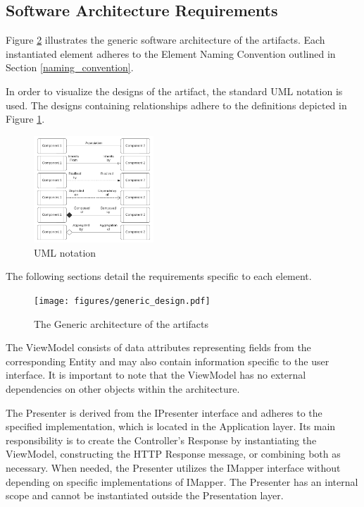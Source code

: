 \subsection{Software Architecture Requirements}\label{software_requirements}

Figure \ref{fig_design} illustrates the generic software architecture of the artifacts.
Each instantiated element adheres to the Element Naming Convention outlined in Section
\ref{naming_convention}. 

In order to visualize the designs of the artifact, the standard UML notation is used. The
designs containing relationships adhere to the definitions depicted in Figure \ref{fi:class_diagram_relationship_notation}.

\begin{figure}[ht!]
  \centering
  \includegraphics[width=0.4\textwidth]{figures/legenda.pdf}
  \caption[UML Notation used]{UML notation}
  \label{fi:class_diagram_relationship_notation}
\end{figure}

The following sections detail the requirements specific to each element.

\begin{figure}[ht!]
    \centering
    \centerline{\texttt{[image: figures/generic\_design.pdf]}}
    \caption[Generic architecture]{The Generic architecture of the artifacts}
    \label{fig_design}
\end{figure}

The ViewModel consists of data attributes representing fields from the corresponding
Entity and may also contain information specific to the user interface. It is important to
note that the ViewModel has no external dependencies on other objects within the
architecture.

The Presenter is derived from the IPresenter interface and adheres to the specified
implementation, which is located in the Application layer. Its main responsibility is to
create the Controller's Response by instantiating the ViewModel, constructing the HTTP
Response message, or combining both as necessary. When needed, the Presenter utilizes the
IMapper interface without depending on specific implementations of IMapper. The Presenter
has an internal scope and cannot be instantiated outside the Presentation layer.

